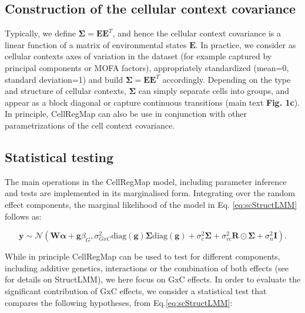 

\subsection{Construction of the cellular context covariance}

Typically, we define $\boldsymbol{\Sigma} = \mathbf{E}\mathbf{E}^T$, and hence the cellular context covariance is a linear function of a matrix of environmental states $\mathbf{E}$.
In practice, we consider as cellular contexts axes of variation in the dataset (for example captured by principal components or MOFA \cite{argelaguet2018multi} factors), appropriately standardized (mean=0, standard deviation=1) and build $\boldsymbol{\Sigma} = \mathbf{E}\mathbf{E}^T$ accordingly.
Depending on the type and structure of cellular contexts, $\boldsymbol{\Sigma}$ can simply separate cells into groups, and appear as a block diagonal or capture continuous transitions (main text \textbf{Fig. 1c}). 
In principle, CellRegMap can also be use in conjunction with other parametrizations of the cell context covariance.

\subsection{Statistical testing}

The main operations in the CellRegMap model, including parameter inference and tests are implemented in its marginalised form. 
Integrating over the random effect components, the marginal likelihood of the model in Eq. \eqref{eq:scStructLMM} follows as:

\begin{equation}
    \label{eq:scStructLMM_marginal}
     \mathbf{y} \sim \mathcal{N} ( \mathbf{W}\boldsymbol{\alpha} + \mathbf{g}\beta_G, \sigma^2_{GxC} \text{diag}(\mathbf{g}) \boldsymbol{\Sigma} \text{diag}(\mathbf{g}) + \sigma_c^2 \boldsymbol{\Sigma} + \sigma_{rc}^2 \mathbf{R} \odot \boldsymbol{\Sigma}+ \sigma_n^2 \mathbf{I} ). 
\end{equation}

While in principle CellRegMap can be used to test for different components, including additive genetics, interactions or the combination of both effects (see~\cite{moore2019linear} for details on StructLMM), we here focus on GxC effects. 
In order to evaluate the significant contribution of GxC effects, we consider a statistical test that compares the following hypotheses, from Eq.\eqref{eq:scStructLMM}:

